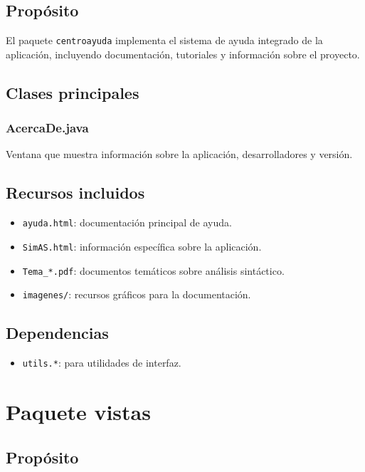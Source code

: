 \subsection{Propósito}

El paquete \texttt{centroayuda} implementa el sistema de ayuda integrado de la aplicación, incluyendo documentación, tutoriales y información sobre el proyecto.

\subsection{Clases principales}

\subsubsection{AcercaDe.java}

Ventana que muestra información sobre la aplicación, desarrolladores y versión.

\subsection{Recursos incluidos}

\begin{itemize}
    \item \texttt{ayuda.html}: documentación principal de ayuda.
    \item \texttt{SimAS.html}: información específica sobre la aplicación.
    \item \verb|Tema_*.pdf|: documentos temáticos sobre análisis sintáctico.
    \item \texttt{imagenes/}: recursos gráficos para la documentación.
\end{itemize}

\subsection{Dependencias}

\begin{itemize}
    \item \texttt{utils.*}: para utilidades de interfaz.
\end{itemize}

\section{Paquete vistas}

\subsection{Propósito}

